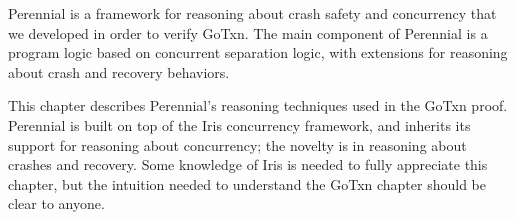 Perennial is a framework for reasoning about crash safety and concurrency that
we developed in order to verify GoTxn. The main component of Perennial is a
program logic based on concurrent separation logic, with extensions for
reasoning about crash and recovery behaviors.

This chapter describes Perennial's reasoning techniques used in the GoTxn proof.
Perennial is built on top of the Iris concurrency framework, and inherits its
support for reasoning about concurrency; the novelty is in reasoning about
crashes and recovery. Some knowledge of Iris is needed to fully appreciate this
chapter, but the intuition needed to understand the GoTxn chapter should be
clear to anyone.




